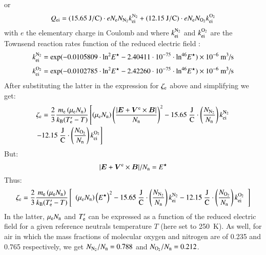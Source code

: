 \documentclass{warpdoc}
\newcommand{\alb}{\vspace{0.1cm}\\} %
\newcommand{\mfd}{\displaystyle}
\renewcommand{\vec}[1]{\bm{#1}}
\begin{document}
%
or
%
\begin{equation} 
 \begin{array}{r}\mfd
 Q_{\rm ei}= (15.65{\rm ~J/C}) \cdot e N_{\rm e} N_{\rm N_2} k_{\rm ei}^{\rm N_2}
           + (12.15{\rm ~J/C}) \cdot e N_{\rm e} N_{\rm O_2} k_{\rm ei}^{\rm O_2}
 \end{array}
\end{equation}
%
with $e$ the elementary charge in Coulomb and where $k_{\rm ei}^{\rm N_2}$ and $k_{\rm ei}^{\rm O_2}$ are the Townsend reaction rates function of the reduced electric field \cite{jcp:2014:parent}:
%
\begin{equation}
 k_{\rm ei}^{\rm N_2}={\rm exp}(-0.0105809\cdot {\rm ln}^2 E^\star - 2.40411\cdot 10^{-75} \cdot {\rm ln}^{46}E^\star)\times 10^{-6}~\textrm{m$^3$/s}
\label{eqn:keiN2}
\end{equation}
%
%
\begin{equation}
 k_{\rm ei}^{\rm O_2}= {\rm exp}(-0.0102785\cdot {\rm ln}^2 E^\star - 2.42260\cdot 10^{-75} \cdot {\rm ln}^{46}E^\star)\times 10^{-6}~\textrm{m$^3$/s}
\label{eqn:keiO2}
\end{equation}
%
After substituting the latter in the expression for $\zeta_{\rm e}$ above and simplifying we get:
%
\begin{equation}
\begin{array}{l}\mfd
\zeta_{\rm e} 
=
 \frac{2}{3} \frac{m_{\rm e} \left(\mu_{\rm e} N_{\rm n}\right)}{k_{\rm B} (T_{\rm e}^\prime-T)} 
\left[  
  \left(\mu_{\rm e} N_{\rm n}\right)  \left( \frac{|\vec{E}+\vec{V}^{\rm e}\times \vec{B}|}{N_{\rm n}}\right)^2
 -15.65~\frac{\rm J}{\rm C}\cdot \left( \frac{N_{\rm N_2}}{N_{\rm n}}\right)  k_{\rm ei}^{\rm N_2} \right.
\alb\mfd
 \left. -12.15~\frac{\rm J}{\rm C}\cdot \left( \frac{N_{\rm O_2}}{N_{\rm n}}\right) k_{\rm ei}^{\rm O_2}
 \right]
\end{array}
 \end{equation}
%
But:
\begin{equation}
|\vec{E}+\vec{V}^{\rm e} \times \vec{B}|/N_{\rm n}=E^\star
\end{equation}
%
Thus:
%
\begin{equation}
\zeta_{\rm e} 
=
 \frac{2}{3} \frac{m_{\rm e} \left(\mu_{\rm e} N_{\rm n}\right)}{k_{\rm B} (T_{\rm e}^\prime-T)} 
\left[  
\begin{array}{r}\mfd
  \left(\mu_{\rm e} N_{\rm n}\right)  \left(E^\star\right)^2
 -15.65~\frac{\rm J}{\rm C}\cdot \left( \frac{N_{\rm N_2}}{N_{\rm n}}\right)  k_{\rm ei}^{\rm N_2}
 -12.15~\frac{\rm J}{\rm C}\cdot \left( \frac{N_{\rm O_2}}{N_{\rm n}}\right) k_{\rm ei}^{\rm O_2}
 \end{array}
 \right]
 \label{eqn:oldzetae2}
 \end{equation}
%
In the latter, $\mu_{\rm e} N_{\rm n}$ and $T_{\rm e}^\prime$ can be expressed as a function of the reduced electric field for a given reference neutrals temperature $T$ (here set to 250~K). As well, for air in which the mass fractions of molecular oxygen and nitrogen are of 0.235 and 0.765 respectively, we get ${N_{\rm N_2}}/{N_{\rm n}}=0.788$ and ${N_{\rm O_2}}/{N_{\rm n}}=0.212$. 
\end{document}
